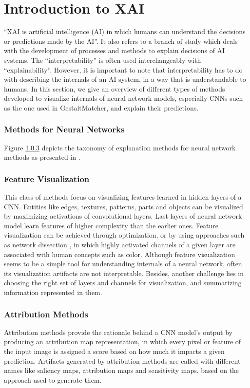 \documentclass[../report.tex]{subfiles}
\begin{document}
    \section{Introduction to XAI}
	\enquote{XAI is artificial intelligence (AI) in which humans can understand the decisions or predictions made by the AI}\cite{vilone2021notions}. It also refers to a branch of study which deals with the development of processes and methods to explain decisions of AI systems. The \enquote{interpretability} is often used interchangeably with \enquote{explainability}. However, it is important to note that interpretability has to do with describing the internals of an AI system, in a way that is understandable to humans. In this section, we give an overview of different types of methods developed to visualize internals of neural network models, especially CNNs such as the one used in GestaltMatcher, and explain their predictions.
	
	\subsubsection{Methods for Neural Networks}
	Figure \ref{} depicts the taxonomy of explanation methods for neural network methods as presented in \cite{molnar2019}. 
	
	\subsubsection{Feature Visualization}
	This class of methods focus on visualizing features learned in hidden layers of a CNN. Entities like edges, textures, patterns, parts and objects can be visualized by maximizing activations of convolutional layers. Last layers of neural network model learn features of higher complexity than the earlier ones.  Feature visualization can be achieved through optimization, or by using approaches such as network dissection \cite{bau2017network}, in which highly activated channels of a given layer are associated with human concepts such as color. Although feature visualization seems to be a simple tool for understanding internals of a neural network, often its visualization artifacts are not interpretable. Besides, another challenge lies in choosing the right set of layers and channels for visualization, and summarizing information represented in them.

	\subsubsection{Attribution Methods}
	Attribution methods provide the rationale behind a CNN model's output by producing an attribution map representation, in which every pixel or feature of the input image is assigned a score based on how much it impacts a given prediction. Artifacts generated by attribution methods are called with different names like saliency maps, attribution maps and sensitivity maps, based on the approach used to generate them.
	
\end{document}
